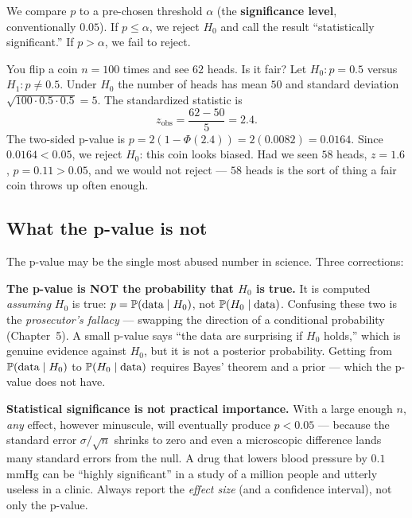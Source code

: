 We compare $p$ to a pre-chosen threshold $\alpha$ (the \textbf{significance level},
conventionally $0.05$). If $p \le \alpha$, we reject $H_0$ and call the result
``statistically significant.'' If $p > \alpha$, we fail to reject.

\begin{example}
\label{ch32:ex-coin}
You flip a coin $n=100$ times and see $62$ heads. Is it fair? Let $H_0\!: p = 0.5$ versus
$H_1\!: p \ne 0.5$. Under $H_0$ the number of heads has mean $50$ and standard deviation
$\sqrt{100 \cdot 0.5 \cdot 0.5}=5$. The standardized statistic is
\[
  z_{\text{obs}} = \frac{62 - 50}{5} = 2.4.
\]
The two-sided p-value is $p = 2(1-\Phi(2.4)) = 2(0.0082) = 0.0164$. Since $0.0164 <
0.05$, we reject $H_0$: this coin looks biased. Had we seen $58$ heads, $z = 1.6$,
$p = 0.11 > 0.05$, and we would not reject --- $58$ heads is the sort of thing a fair
coin throws up often enough.
\end{example}

\subsection{What the p-value is not}

The p-value may be the single most abused number in science. Three corrections:

\begin{trapbox}
\textbf{The p-value is NOT the probability that $H_0$ is true.} It is computed
\emph{assuming} $H_0$ is true: $p = \operatorname{\mathbb{P}}(\text{data}\mid H_0)$, not $\operatorname{\mathbb{P}}(H_0\mid
\text{data})$. Confusing these two is the \emph{prosecutor's fallacy} --- swapping the
direction of a conditional probability (Chapter~5). A small p-value says ``the data are
surprising if $H_0$ holds,'' which is genuine evidence against $H_0$, but it is not a
posterior probability. Getting from $\operatorname{\mathbb{P}}(\text{data}\mid H_0)$ to $\operatorname{\mathbb{P}}(H_0\mid
\text{data})$ requires Bayes' theorem and a prior --- which the p-value does not have.
\end{trapbox}

\begin{trapbox}
\textbf{Statistical significance is not practical importance.} With a large enough $n$,
\emph{any} effect, however minuscule, will eventually produce $p<0.05$ --- because
the standard error $\sigma/\sqrt n$ shrinks to zero and even a microscopic difference
lands many standard errors from the null. A drug that lowers blood pressure by
$0.1$ mmHg can be ``highly significant'' in a study of a million people and utterly
useless in a clinic. Always report the \emph{effect size} (and a confidence interval),
not only the p-value.
\end{trapbox}

